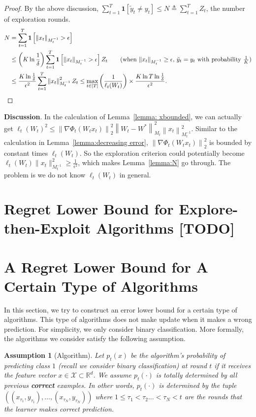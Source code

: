 \documentclass{article}
\newcommand{\calX}{{\mathcal{X}}}
\newcommand{\one}{\boldsymbol{1}}
\newcommand{\nb}{\nabla}
\newcommand{\norm}[1]{\left\|{#1}\right\|}
\newtheorem{assumption}{Assumption}
\begin{document}
\begin{proof}
By the above discussion, $\sum_{t=1}^T \one[\tilde{y}_t\neq y_t] \leq N\triangleq \sum_{t=1}^T Z_t$, the number of exploration rounds. 
\begin{align*}
    N &= \sum_{t=1}^T \one\left[\norm{x_t}_{M_t^{-1}}> \epsilon\right]\\
    &\leq \left(K\ln \frac{1}{\delta}\right)\sum_{t=1}^T \one\left[\norm{x_t}_{M_t^{-1}}> \epsilon\right]Z_t \tag{when $\|x_t\|_{M_t^{-1}}\geq \epsilon$, $\tilde{y}_t=y_t$ with probability $\frac{1}{K}$} \\
    & \leq \frac{K\ln \frac{1}{\delta}}{\epsilon^2}\sum_{t=1}^T \norm{x_t}_{M_t^{-1}}^2 Z_t \leq \max_{t\in[T]}\left(\frac{1}{\ell_{t}(W_t)}\right)\times \frac{K\ln T\ln \frac{1}{\delta}}{\epsilon^2}. 
\end{align*}
\end{proof}


\textbf{Discussion}. 
In the calculation of Lemma~\ref{lemma: xbounded},  we can actually get $\ell_t(W_t)^2 \leq \norm{\nb\Phi_t(W_tx_t)}_2^2\norm{W_t-W^*}_{M_t}^2\norm{x_t}_{M_t^{-1}}^2$. Similar to the calculation in Lemma~\ref{lemma:decreasing error}, $\norm{\nb\Phi_t(W_tx_t)}_2^2$ is bounded by constant times $\ell_t(W_t)$. So the exploration criterion could potentially become $\ell_t(W_t)\|x_t\|_{M_t^{-1}}^2\geq \frac{1}{\epsilon^2}$, which makes Lemma~\ref{lemma:N} go through. The problem is we do not know $\ell_t(W_t)$ in general. 


\section{Regret Lower Bound for Explore-then-Exploit Algorithms {\color{red}[TODO]}}

\section{A Regret Lower Bound for A Certain Type of Algorithms}
\label{section: passive lower bound}
In this section, we try to construct an error lower bound for a certain type of algorithms. This type of algorithms does not make update when it makes a wrong prediction. For simplicity, we only consider binary classification.  More formally, the algorithms we consider satisfy the following assumption. 

\begin{assumption}[Algorithm]
Let $p_t(x)$ be the algorithm's probability of predicting class $1$ (recall we consider binary classification) at round $t$ if it receives the feature vector $x\in \calX \subset \mathbb{R}^d$. We assume $p_t(\cdot)$ is totally determined by all previous \textbf{correct} examples. In other words, $p_t(\cdot)$ is determined by the tuple $((x_{\tau_1}, y_{\tau_1}), \ldots, (x_{\tau_N}, y_{\tau_N}))$ where $1\leq \tau_1 < \tau_2 \ldots < \tau_N < t$ are the rounds that the learner makes correct prediction. 
\end{assumption}
\end{document}
